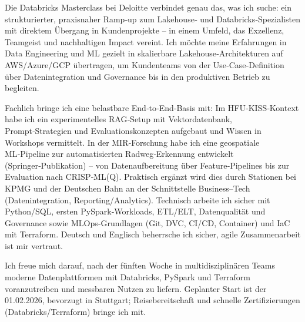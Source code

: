 Die Databricks Masterclass bei Deloitte verbindet genau das, was ich suche: ein strukturierter, praxisnaher Ramp‑up zum Lakehouse‑ und Databricks‑Spezialisten mit direktem Übergang in Kundenprojekte – in einem Umfeld, das Exzellenz, Teamgeist und nachhaltigen Impact vereint. Ich möchte meine Erfahrungen in Data Engineering und ML gezielt in skalierbare Lakehouse‑Architekturen auf AWS/Azure/GCP übertragen, um Kundenteams von der Use‑Case‑Definition über Datenintegration und Governance bis in den produktiven Betrieb zu begleiten.

Fachlich bringe ich eine belastbare End‑to‑End‑Basis mit: Im HFU‑KISS‑Kontext habe ich ein experimentelles RAG‑Setup mit Vektordatenbank, Prompt‑Strategien und Evaluationskonzepten aufgebaut und Wissen in Workshops vermittelt. In der MIR‑Forschung habe ich eine geospatiale ML‑Pipeline zur automatisierten Radweg‑Erkennung entwickelt (Springer‑Publikation) – von Datenaufbereitung über Feature‑Pipelines bis zur Evaluation nach CRISP‑ML(Q). Praktisch ergänzt wird dies durch Stationen bei KPMG und der Deutschen Bahn an der Schnittstelle Business–Tech (Datenintegration, Reporting/Analytics). Technisch arbeite ich sicher mit Python/SQL, ersten PySpark‑Workloads, ETL/ELT, Datenqualität und Governance sowie MLOps‑Grundlagen (Git, DVC, CI/CD, Container) und IaC mit Terraform. Deutsch und Englisch beherrsche ich sicher, agile Zusammenarbeit ist mir vertraut.

Ich freue mich darauf, nach der fünften Woche in multidisziplinären Teams moderne Datenplattformen mit Databricks, PySpark und Terraform voranzutreiben und messbaren Nutzen zu liefern. Geplanter Start ist der 01.02.2026, bevorzugt in Stuttgart; Reisebereitschaft und schnelle Zertifizierungen (Databricks/Terraform) bringe ich mit.